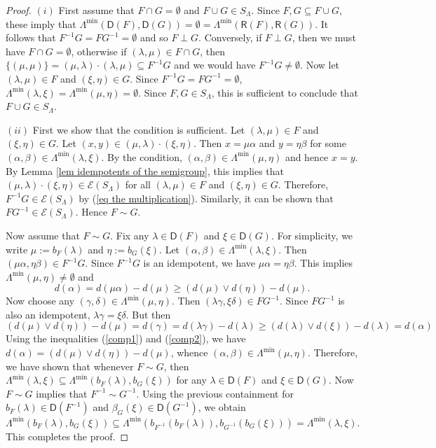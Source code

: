 \documentclass[a4paper,reqno,11pt]{amsart}
\numberwithin{equation}{section}
\theoremstyle{definition}
\theoremstyle{remark}
\def\b{\beta}
\begin{document}
\begin{proof}
$(i)$ First assume that $F\cap G=\emptyset$ and $F\cup G\in S_\Lambda$. Since $F,G\subseteq F\cup G$, these imply that $\Lambda^{\min}(\mathsf{D}(F),\mathsf{D}(G))=\emptyset=\Lambda^{\min}(\mathsf{R}(F),\mathsf{R}(G))$. It follows that $F^{-1}G=FG^{-1}=\emptyset$ and so $F\perp G$. Conversely, if $F\perp G$, then we must have $F\cap G=\emptyset$, otherwise if $(\lambda,\mu)\in F\cap G$, then $\{(\mu,\mu)\}=(\mu,\lambda)\cdot (\lambda,\mu)\subseteq F^{-1}G$ and we would have $F^{-1}G\neq \emptyset$. Now let $(\lambda,\mu)\in F$ and $(\xi,\eta)\in G$. Since $F^{-1}G=FG^{-1}=\emptyset$, $\Lambda^{\min}(\lambda,\xi)=\Lambda^{\min}(\mu,\eta)=\emptyset$. Since $F,G\in S_\Lambda$, this is sufficient to conclude that $F\cup G\in S_\Lambda$. 

$(ii)$ First we show that the condition is sufficient. Let $(\lambda,\mu)\in F$ and $(\xi,\eta)\in G$. Let $(x,y)\in (\mu,\lambda)\cdot (\xi,\eta)$. Then $x=\mu\alpha$ and $y=\eta\beta$ for some $(\alpha,\beta)\in \Lambda^{\min}(\lambda,\xi)$. By the condition, $(\alpha,\beta)\in \Lambda^{\min}(\mu,\eta)$ and hence $x=y$. By Lemma \ref{lem idempotents of the semigroup}, this implies that $(\mu,\lambda)\cdot (\xi,\eta)\in \mathcal{E}(S_\Lambda)$ for all $(\lambda,\mu)\in F$ and $(\xi,\eta)\in G$. Therefore, $F^{-1}G\in \mathcal{E}(S_\Lambda)$ by (\ref{eq the multiplication}). Similarly, it can be shown that $FG^{-1}\in \mathcal{E}(S_\Lambda)$. Hence $F\sim G$.

Now assume that $F\sim G$. Fix any $\lambda\in \mathsf{D}(F)$ and $\xi\in \mathsf{D}(G)$. For simplicity, we write $\mu:=b_F(\lambda)$ and $\eta:=b_G(\xi)$. Let $(\alpha,\beta)\in \Lambda^{\min}(\lambda,\xi)$. Then $(\mu\alpha,\eta\beta)\in F^{-1}G$. Since $F^{-1}G$ is an idempotent, we have $\mu\alpha=\eta\beta$. This implies $\Lambda^{\min}(\mu,\eta)\neq \emptyset$ and 
\begin{equation}\label{comp1}
d(\alpha)=d(\mu\alpha)-d(\mu)\ge \left(d(\mu)\vee d(\eta)\right)-d(\mu).
\end{equation}
Now choose any $(\gamma,\delta)\in \Lambda^{\min}(\mu,\eta)$. Then $(\lambda\gamma,\xi\delta)\in FG^{-1}$. Since $FG^{-1}$ is also an idempotent, $\lambda\gamma=\xi\delta$. But then 
\begin{equation}\label{comp2}
\left(d(\mu)\vee d(\eta)\right)-d(\mu)=d(\gamma)=d(\lambda\gamma)-d(\lambda)\ge \left(d(\lambda)\vee d(\xi)\right)-d(\lambda)=d(\alpha)
\end{equation}
Using the inequalities (\ref{comp1}) and (\ref{comp2}), we have $d(\alpha)=\left(d(\mu)\vee d(\eta)\right)-d(\mu)$, whence $(\alpha,\beta)\in \Lambda^{\min}(\mu,\eta)$. Therefore, we have shown that whenever $F\sim G$, then $\Lambda^{\min}(\lambda,\xi)\subseteq \Lambda^{\min}(b_F(\lambda),b_G(\xi))$ for any $\lambda\in \mathsf{D}(F)$ and $\xi\in \mathsf{D}(G)$. Now $F\sim G$ implies that $F^{-1}\sim G^{-1}$. Using the previous containment for $b_F(\lambda)\in \mathsf{D}(F^{-1})$ and $\b_G(\xi)\in \mathsf{D}(G^{-1})$, we obtain \[\Lambda^{\min}(b_F(\lambda),b_G(\xi))\subseteq \Lambda^{\min}\left(b_{F^{-1}}(b_F(\lambda)),b_{G^{-1}}(b_G(\xi))\right)=\Lambda^{\min}(\lambda,\xi).\] This completes the proof.
\end{proof}
  
\end{document}
